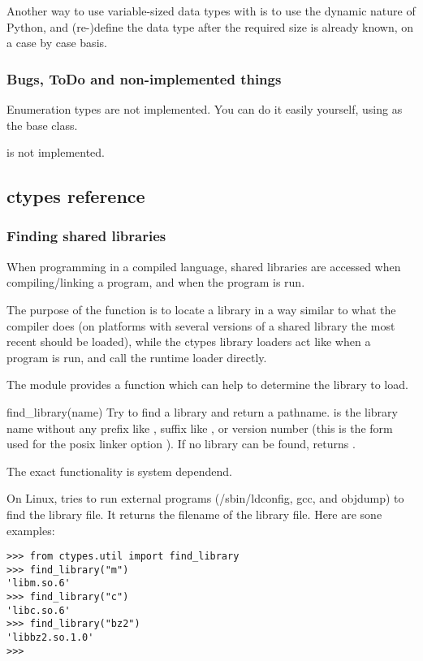 Another way to use variable-sized data types with  is to use
the dynamic nature of Python, and (re-)define the data type after the
required size is already known, on a case by case basis.


\subsubsection{Bugs, ToDo and non-implemented things\label{ctypes-bugs-todo-non-implemented-things}}

Enumeration types are not implemented. You can do it easily yourself,
using  as the base class.

 is not implemented.


\subsection{ctypes reference\label{ctypes-ctypes-reference}}


\subsubsection{Finding shared libraries\label{ctypes-finding-shared-libraries}}

When programming in a compiled language, shared libraries are accessed
when compiling/linking a program, and when the program is run.

The purpose of the  function is to locate a library in
a way similar to what the compiler does (on platforms with several
versions of a shared library the most recent should be loaded), while
the ctypes library loaders act like when a program is run, and call
the runtime loader directly.

The  module provides a function which can help to
determine the library to load.

\begin{datadescni}{find_library(name)}
Try to find a library and return a pathname.   is the
library name without any prefix like , suffix like ,
 or version number (this is the form used for the posix
linker option ).  If no library can be found, returns
.
\end{datadescni}

The exact functionality is system dependend.

On Linux,  tries to run external programs
(/sbin/ldconfig, gcc, and objdump) to find the library file.  It
returns the filename of the library file.  Here are sone examples:
\begin{verbatim}
>>> from ctypes.util import find_library
>>> find_library("m")
'libm.so.6'
>>> find_library("c")
'libc.so.6'
>>> find_library("bz2")
'libbz2.so.1.0'
>>>
\end{verbatim}

